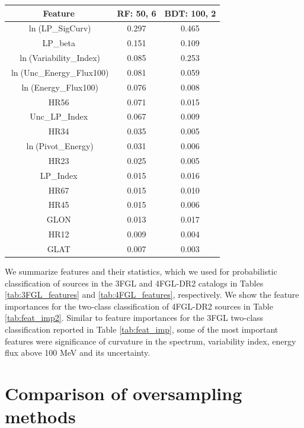\documentclass[referee]{aa} %
\newcommand{\lb}{\label}
\begin{document}
\begin{appendix}
\begin{table}[!h]
\tiny
\centering
\renewcommand{\tabcolsep}{1mm}
\renewcommand{\arraystretch}{1}

\begin{tabular}{c c c}
\hline
\hline
Feature & RF: 50, 6& BDT: 100, 2\\
\hline
{ $\ln$(LP\_SigCurv)}&  0.297  & 0.465   \\
{LP\_beta}&0.151&0.109\\
{ $\ln$(Variability\_Index)} &0.085& 0.253   \\
$\ln$(Unc\_Energy\_Flux100)& 0.081&0.059  \\
$\ln$(Energy\_Flux100) & 0.076&0.008   \\
HR56&0.071& 0.015  \\
Unc\_LP\_Index & 0.067&0.009  \\
HR34& 0.035&0.005  \\
$\ln$(Pivot\_Energy)&0.031&0.006\\
HR23 &0.025& 0.005     \\
 LP\_Index& 0.015&0.016  \\
HR67&0.015&0.010\\
HR45&0.015&0.006\\
GLON&0.013&0.017\\
HR12&0.009&0.004\\
GLAT&0.007&0.003\\
\hline
\end{tabular}
\end{table}



We summarize features and their statistics,
which we used for probabilistic classification of sources in the 3FGL and 4FGL-DR2 catalogs
in Tables \ref{tab:3FGL_features} and \ref{tab:4FGL_features}, respectively. 
We show the feature importances for the two-class classification of 4FGL-DR2 sources in Table \ref{tab:feat_imp2}.
Similar to feature importances for the 3FGL two-class classification reported in Table \ref{tab:feat_imp}, 
some of the most important features were significance of curvature in the spectrum, variability index, energy flux above 100 MeV and its uncertainty.

\section{Comparison of oversampling methods}
\lb{sec:app_O_vs_S}


\end{appendix}
\end{document}
